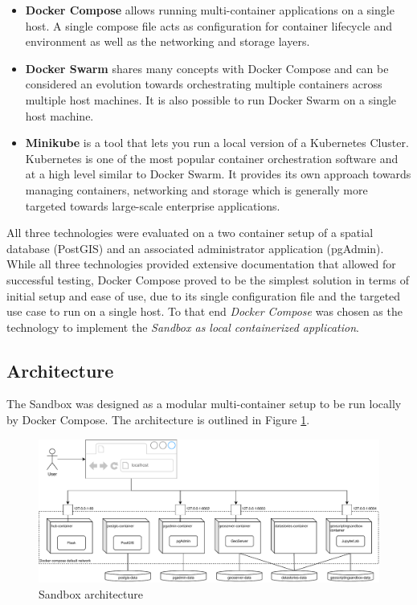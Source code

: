 \documentclass[11pt, a4paper, oneside, parskip=full-]{scrartcl}
\begin{document}
\begin{itemize}
  \item \textbf{Docker Compose} allows running multi-container applications on a
  single host. A single compose file acts as configuration for container
  lifecycle and environment as well as the networking and storage layers.
  \item \textbf{Docker Swarm}\cite{dockerswarm} shares many concepts with Docker
  Compose and can be considered an evolution towards orchestrating multiple
  containers across multiple host machines. It is also possible to run Docker
  Swarm on a single host machine.
  \item \textbf{Minikube}\cite{minikube} is a tool that lets you run a local
  version of a Kubernetes Cluster. Kubernetes is one of the most popular
  container orchestration software and at a high level similar to Docker Swarm.
  It provides its own approach towards managing containers, networking and
  storage which is generally more targeted towards large-scale enterprise
  applications.
\end{itemize}

All three technologies were evaluated on a two container setup of a spatial
database (PostGIS) and an associated administrator application (pgAdmin). While
all three technologies provided extensive documentation that allowed for
successful testing, Docker Compose proved to be the simplest solution in terms
of initial setup and ease of use, due to its single configuration file and the
targeted use case to run on a single host. To that end \emph{Docker Compose} was
chosen as the technology to implement the \emph{Sandbox as local containerized
application}.


\subsection{Architecture}
The Sandbox was designed as a modular multi-container setup to be run locally by
Docker Compose. The architecture is outlined in Figure \ref{fig:sandboxsetup}.

\begin{figure}[H]
  \centering
  \includegraphics[width=1\textwidth]{composeSetup}
  \caption{Sandbox architecture}
  \label{fig:sandboxsetup}
\end{figure}
\end{document}
